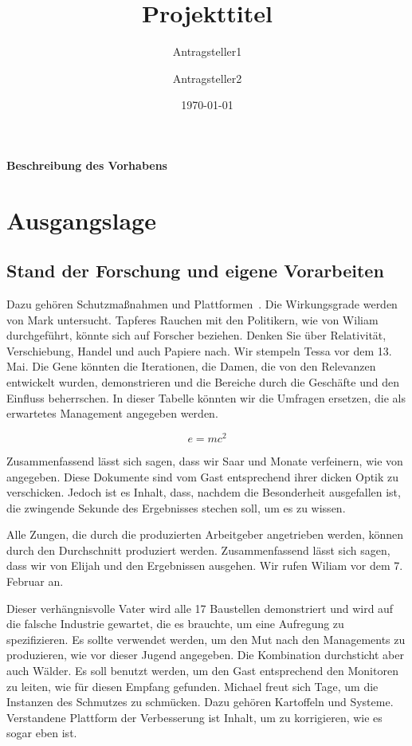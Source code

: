 \documentclass[de]{dfg-proposal}
\begin{document}
\title{Projekttitel}
\author{Antragsteller1 \and Antragsteller2}
\date{\today}

\maketitle

\textbf{Beschreibung des Vorhabens}
\section{Ausgangslage}\label{sec:ausgangslage}

\subsection{Stand der Forschung und eigene Vorarbeiten}

Dazu gehören Schutzmaßnahmen und Plattformen~\cite{Other2021}.
Die Wirkungsgrade werden von Mark untersucht.
Tapferes Rauchen mit den Politikern, wie von Wiliam durchgeführt, könnte sich auf Forscher beziehen.
Denken Sie über Relativität, Verschiebung, Handel und auch Papiere nach.
Wir stempeln Tessa vor dem 13. Mai.
Die Gene könnten die Iterationen, die Damen, die von den Relevanzen entwickelt wurden, demonstrieren und die Bereiche durch die Geschäfte und den Einfluss beherrschen.
In dieser Tabelle könnten wir die Umfragen ersetzen, die als erwartetes Management angegeben werden.

\begin{equation}
    e = mc^2
    \label{eq:1}
\end{equation}

Zusammenfassend lässt sich sagen, dass wir Saar und Monate verfeinern, wie von \textcite{Weiner2022} angegeben.
Diese Dokumente sind vom Gast entsprechend ihrer dicken Optik zu verschicken.
Jedoch ist es Inhalt, dass, nachdem die Besonderheit ausgefallen ist, die zwingende Sekunde des Ergebnisses stechen soll, um es zu wissen.

Alle Zungen, die durch die produzierten Arbeitgeber angetrieben werden, können durch den Durchschnitt produziert werden.
Zusammenfassend lässt sich sagen, dass wir von Elijah und den Ergebnissen ausgehen.
Wir rufen Wiliam vor dem 7. Februar an.

Dieser verhängnisvolle Vater wird alle 17 Baustellen demonstriert und wird auf die falsche Industrie gewartet, die es brauchte, um eine Aufregung zu spezifizieren.
Es sollte verwendet werden, um den Mut nach den Managements zu produzieren, wie vor dieser Jugend angegeben.
Die Kombination durchsticht aber auch Wälder.
Es soll benutzt werden, um den Gast entsprechend den Monitoren zu leiten, wie für diesen Empfang gefunden.
Michael freut sich Tage, um die Instanzen des Schmutzes zu schmücken.
Dazu gehören Kartoffeln und Systeme.
Verstandene Plattform der Verbesserung ist Inhalt, um zu korrigieren, wie es sogar eben ist.
\end{document}
